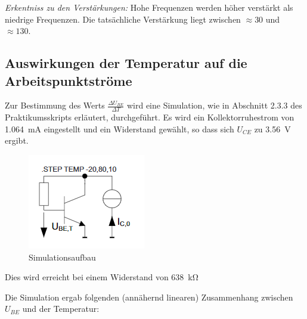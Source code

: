 \emph{Erkentniss zu den Verstärkungen:} Hohe Frequenzen werden höher verstärkt als niedrige Frequenzen. Die tatsächliche Verstärkung liegt zwischen $\approx 30$ und $\approx 130$.

\subsection{Auswirkungen der Temperatur auf die Arbeitspunktströme}

Zur Bestimmung des Werts $\frac{\Delta U_{BE}}{\Delta T}$ wird eine Simulation, wie in Abschnitt 2.3.3 des Praktikumsskripts erläutert, durchgeführt.
Es wird ein Kollektorruhestrom von \SI{1.064}{\milli \ampere} eingestellt und ein Widerstand gewählt, so dass sich $U_{CE}$ zu \SI{3.56}{\volt} ergibt.

\begin{figure}[H]
    \centering
    \includegraphics{tex/1_Microphone/pictures/Aufbau, Tempsimulation.png}
    \caption{Simulationsaufbau}
    \label{fig:my_label}
\end{figure}

Dies wird erreicht bei einem Widerstand von \SI{638}{\kilo \ohm}

Die Simulation ergab folgenden (annähernd linearen) Zusammenhang zwischen $U_{BE}$ und der Temperatur:

